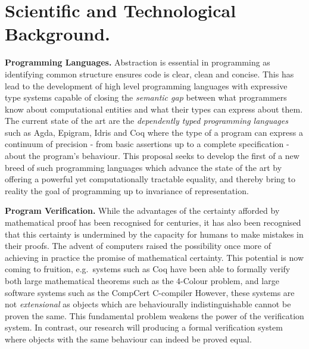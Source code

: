 \documentclass[a4paper,11pt]{article}
\newcommand{\eg}{{e.g.}\ }
\begin{document}

\vspace*{-0.1in} 
\section{Scientific and Technological Background.}
\vspace*{-0.1in} 

{\bf Programming Languages.} Abstraction is essential in programming
as identifying common structure ensures code is clear,
clean and concise. This has lead to the development of high level
programming languages with expressive type systems capable of closing
the {\em semantic gap} between what programmers know about
computational entities and what their types can express about them.
The current state of the art are the {\em dependently typed
  programming languages} such as Agda, Epigram, Idris and Coq where
the type of a program can express a
continuum of precision - from basic assertions up to a complete
specification - about the program’s behaviour. This proposal seeks to
develop the first of a new breed of 
such programming languages which advance the state of the art by offering a
powerful yet computationally tractable equality, and thereby bring to
reality the goal of programming up to invariance of representation.


{\bf Program Verification.} While the advantages of the certainty
afforded by mathematical proof has been recognised for centuries, it
has also been recognised that this certainty is undermined by the
capacity for humans to make mistakes in their proofs. The advent of
computers raised the possibility once more of achieving in practice
the promise of mathematical certainty. This potential is now coming to
fruition, \eg systems such as Coq have been able to formally verify
both large mathematical theorems such as the 4-Colour problem, and
large software systems such as the CompCert C-compiler However, these
systems are not {\em extensional} as objects which are behaviourally
indistinguishable cannot be proven the same. This fundamental problem
weakens the power of the verification system. In contrast, our
research will producing a formal verification system where objects
with the same behaviour can indeed be proved equal.
\end{document}
